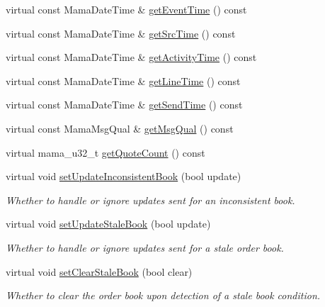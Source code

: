 \begin{CompactItemize}
\item 
virtual const Mama\-Date\-Time \& \hyperlink{classMamdaQuoteToBookListener_ff147fdfb64bad58dc439addc0eea46b}{get\-Event\-Time} () const 
\item 
virtual const Mama\-Date\-Time \& \hyperlink{classMamdaQuoteToBookListener_1c5157c6e1d241d1d78133731b44d01a}{get\-Src\-Time} () const 
\item 
virtual const Mama\-Date\-Time \& \hyperlink{classMamdaQuoteToBookListener_d8627c07f82c0c7c88401cc096e16cd8}{get\-Activity\-Time} () const 
\item 
virtual const Mama\-Date\-Time \& \hyperlink{classMamdaQuoteToBookListener_e6897c75c5d12dc67f573946499506b3}{get\-Line\-Time} () const 
\item 
virtual const Mama\-Date\-Time \& \hyperlink{classMamdaQuoteToBookListener_f36e8e40182ebe8d6e1c2d5445e0590e}{get\-Send\-Time} () const 
\item 
virtual const Mama\-Msg\-Qual \& \hyperlink{classMamdaQuoteToBookListener_78bc7b821c48a99ecdff7f959763f7e2}{get\-Msg\-Qual} () const 
\item 
virtual mama\_\-u32\_\-t \hyperlink{classMamdaQuoteToBookListener_55fd792381e1d706b160a2fbd7fe7ad4}{get\-Quote\-Count} () const 
\item 
virtual void \hyperlink{classMamdaQuoteToBookListener_99053d73f15f7f0dfc971d341e1e75c6}{set\-Update\-Inconsistent\-Book} (bool update)
\begin{CompactList}\small\item\em Whether to handle or ignore updates sent for an inconsistent book. \item\end{CompactList}\item 
virtual void \hyperlink{classMamdaQuoteToBookListener_008e8954749115fa7cedc257e61480c3}{set\-Update\-Stale\-Book} (bool update)
\begin{CompactList}\small\item\em Whether to handle or ignore updates sent for a stale order book. \item\end{CompactList}\item 
virtual void \hyperlink{classMamdaQuoteToBookListener_f82df90339d23957d41fc15831b6753f}{set\-Clear\-Stale\-Book} (bool clear)
\begin{CompactList}\small\item\em Whether to clear the order book upon detection of a stale book condition. \item\end{CompactList}\item 

\end{CompactItemize}
